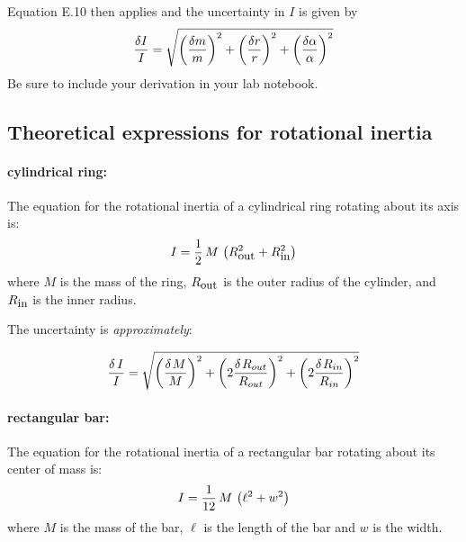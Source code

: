 Equation E.10 then applies and 
the uncertainty in $I$ is given by
\begin{equation}
{\delta I \over I} = \sqrt{
                           \left( {\delta m \over m} \right)^2  +
                           \left( {\delta r \over r} \right)^2  +
                       \left( {{\delta \alpha} \over \alpha} \right)^2
                     }
\end{equation}
Be sure to include your derivation in your lab notebook.


\subsection*{Theoretical expressions for rotational inertia}

\paragraph*{cylindrical ring:}
The equation for the rotational inertia of a
cylindrical ring rotating about its axis is:
\begin{equation}
I = {{1} \over {2}} \, M \, \left( R_{\mbox{{\small out}}}^{2} +
    R_{\mbox{{\small in}}}^{2}
    \right)    \label{eq:rot2}
\end{equation}
where $M$ is the mass of the ring, $R_{\mbox{{\small out}}}$ is the
outer radius of
the cylinder, and $R_{\mbox{{\small in}}}$ is the inner radius.

The uncertainty is {\em approximately}:

\begin{equation}
{{\delta \,I} \over I}=\sqrt {\left( {{{\delta \kern 1pt M} \over M}} \right)^2+\left( {2{{\delta \kern 1pt R_{out}} \over {R_{out}}}} \right)^2+\left( {2{{\delta \kern 1pt R_{in}} \over {R_{in}}}} \right)^2}
\end{equation}

\paragraph*{rectangular bar:}
The  equation for
the rotational inertia of a rectangular bar rotating about its center
of mass is: \begin{equation}
I = {{1} \over {12}} \, M \, \left( \ell^{2} + w^{2}  \right)
       \label{eq:rot3}
\end{equation}
where $M$ is the mass of the bar, $\ell$ is the length of the bar and $w$
is the width.

